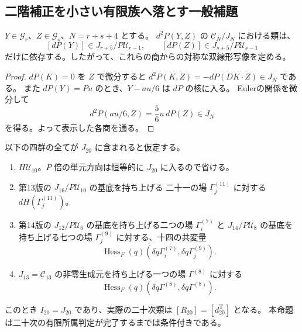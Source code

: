 \subsection{二階補正を小さい有限族へ落とす一般補題}

\begin{lemma}[Jacobian像を法とした二階作用]
\label{lem:v15-hessian-pairing-quotient}
$Y\in\mathcal G_r$、$Z\in\mathcal G_s$、$N=r+s+4$ とする。
$d^2P(Y,Z)$ の $\mathcal C_N/J_N$ における類は、
\[
 [dP(Y)]\in J_{r+5}/P\mathcal U_{r-1},\qquad
 [dP(Z)]\in J_{s+5}/P\mathcal U_{s-1}
\]
だけに依存する。したがって、これらの商からの対称な双線形写像を定める。
\end{lemma}

\begin{proof}
$dP(K)=0$ を $Z$ で微分すると
$d^2P(K,Z)=-dP(DK\cdot Z)\in J_N$ である。
また $dP(Y)=Pu$ のとき、$Y-au/6$ は $dP$ の核に入る。
Eulerの関係を微分して
\[
 d^2P(a u/6,Z)=\frac56u\,dP(Z)\in J_N
\]
を得る。よって表示した各商を通る。
\end{proof}

\begin{proposition}[二十次の補正を全て判定する有限族]
\label{prop:v15-finite-lower-tests}
以下の四群の全てが $J_{20}$ に含まれると仮定する。
\begin{enumerate}
 \item $H\mathcal U_{10}$。$P$ 倍の単元方向は恒等的に $J_{20}$ に入るので省ける。
 \item 第13版の $J_{16}/P\mathcal U_{10}$ の基底を持ち上げる
 二十一の場 $\Gamma_j^{(11)}$ に対する $dH(\Gamma_j^{(11)})$。
 \item 第14版の $J_{12}/P\mathcal U_6$ の基底を持ち上げる二つの場
 $\Gamma_i^{(7)}$ と $J_{14}/P\mathcal U_8$ の基底を持ち上げる七つの場
 $\Gamma_j^{(9)}$ に対する、十四の共変量
 \[
 \operatorname{Hess}_F(q)
    (\delta q\Gamma_i^{(7)},\delta q\Gamma_j^{(9)}).
 \]
 \item $J_{13}=\mathcal C_{13}$ の非零生成元を持ち上げる一つの場
 $\Gamma^{(8)}$ に対する
 \[
 \operatorname{Hess}_F(q)(\delta q\Gamma^{(8)},\delta q\Gamma^{(8)}).
 \]
\end{enumerate}
このとき $I_{20}=J_{20}$ であり、実際の二十次類は
$[R_{20}]=[d_{20}^{\mathrm T}]$ となる。
本命題は二十次の有限所属判定が完了するまでは条件付きである。
\end{proposition}

